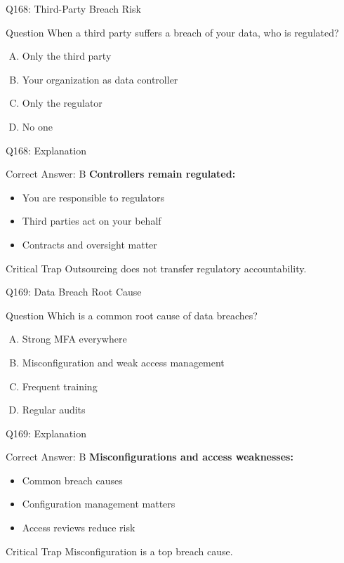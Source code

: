 \documentclass{beamer}
\begin{document}
	\begin{frame}{Q168: Third-Party Breach Risk}
		\begin{block}{Question}
			When a third party suffers a breach of your data, who is regulated?
		\end{block}
		\begin{enumerate}[(A)]
			\item Only the third party
			\item Your organization as data controller
			\item Only the regulator
			\item No one
		\end{enumerate}
	\end{frame}
	
	\begin{frame}{Q168: Explanation}
		\begin{block}{Correct Answer: B}
			\textbf{Controllers remain regulated:}
			\begin{itemize}
				\item You are responsible to regulators
				\item Third parties act on your behalf
				\item Contracts and oversight matter
			\end{itemize}
		\end{block}
		\begin{alertblock}{Critical Trap}
			Outsourcing does not transfer regulatory accountability.
		\end{alertblock}
	\end{frame}
	
	\begin{frame}{Q169: Data Breach Root Cause}
		\begin{block}{Question}
			Which is a common root cause of data breaches?
		\end{block}
		\begin{enumerate}[(A)]
			\item Strong MFA everywhere
			\item Misconfiguration and weak access management
			\item Frequent training
			\item Regular audits
		\end{enumerate}
	\end{frame}
	
	\begin{frame}{Q169: Explanation}
		\begin{block}{Correct Answer: B}
			\textbf{Misconfigurations and access weaknesses:}
			\begin{itemize}
				\item Common breach causes
				\item Configuration management matters
				\item Access reviews reduce risk
			\end{itemize}
		\end{block}
		\begin{alertblock}{Critical Trap}
			Misconfiguration is a top breach cause.
		\end{alertblock}
	\end{frame}
	
\end{document}
